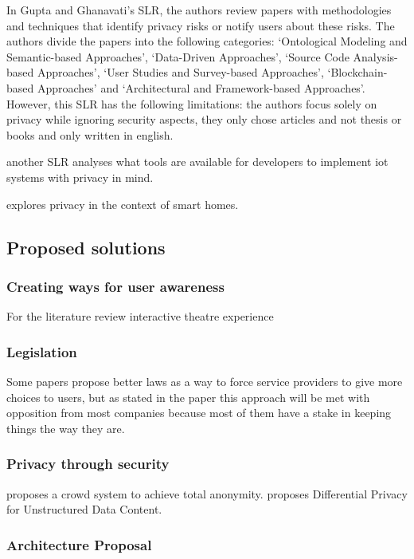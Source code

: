 \documentclass[conference]{IEEEtran}
\begin{document}
In Gupta and Ghanavati's \cite{Gupta2022Privacy} SLR,
the authors review papers with methodologies and techniques that identify privacy risks or
notify users about these risks. The authors divide the papers into the following
categories: `Ontological Modeling and Semantic-based Approaches', `Data-Driven Approaches',
`Source Code Analysis-based Approaches', `User Studies and Survey-based Approaches',
`Blockchain-based Approaches' and `Architectural and Framework-based Approaches'.
However, this SLR has the following limitations: the authors focus solely on privacy
while ignoring security aspects, they only chose articles and not thesis or books and only
written in english.

another SLR \cite{KUHTREIBER2022101656} analyses what tools are available for developers
to implement iot systems with privacy in mind.

\cite{AbbottPrivacy} explores privacy in the context of smart homes.

\subsection{Proposed solutions}

\subsubsection{Creating ways for user awareness}

For the literature review interactive theatre experience \cite{SkirpanPrivacy}

\subsubsection{Legislation}

Some papers propose better laws \cite{} as a way to force service providers
to give more choices to users, but as stated in the paper this
approach will be met with opposition from most companies because
most of them have a stake in keeping things the way they are.

\subsubsection{Privacy through security}

\cite{SunSecure} proposes a crowd system to achieve total anonymity.
\cite{ZhaoSurvey} proposes Differential Privacy for Unstructured Data Content.

\subsubsection{Architecture Proposal}
\end{document}

